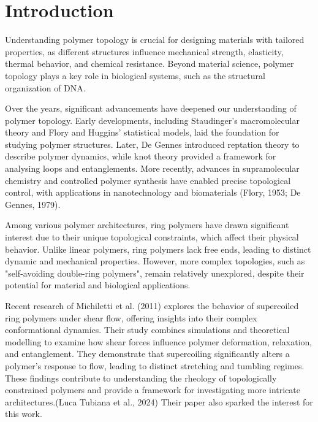 \documentclass{article}      %
\begin{document}
\newpage

\tableofcontents

\newpage

\section{Introduction}

Understanding polymer topology is crucial for designing materials with tailored properties, as different structures influence mechanical strength, elasticity, thermal behavior, and chemical resistance. Beyond material science, polymer topology plays a key role in biological systems, such as the structural organization of DNA.

Over the years, significant advancements have deepened our understanding of polymer topology. Early developments, including Staudinger’s macromolecular theory and Flory and Huggins’ statistical models, laid the foundation for studying polymer structures. Later, De Gennes introduced reptation theory to describe polymer dynamics, while knot theory provided a framework for analysing loops and entanglements. More recently, advances in supramolecular chemistry and controlled polymer synthesis have enabled precise topological control, with applications in nanotechnology and biomaterials (Flory, 1953; De Gennes, 1979).

Among various polymer architectures, ring polymers have drawn significant interest due to their unique topological constraints, which affect their physical behavior. Unlike linear polymers, ring polymers lack free ends, leading to distinct dynamic and mechanical properties. However, more complex topologies, such as "self-avoiding double-ring polymers", remain relatively unexplored, despite their potential for material and biological applications.

Recent research of Michiletti et al. (2011) explores the behavior of supercoiled ring polymers under shear flow, offering insights into their complex conformational dynamics. Their study combines simulations and theoretical modelling to examine how shear forces influence polymer deformation, relaxation, and entanglement. They demonstrate that supercoiling significantly alters a polymer’s response to flow, leading to distinct stretching and tumbling regimes. These findings contribute to understanding the rheology of topologically constrained polymers and provide a framework for investigating more intricate architectures.(Luca Tubiana et al., 2024) Their paper also sparked the interest for this work. 
\end{document}
